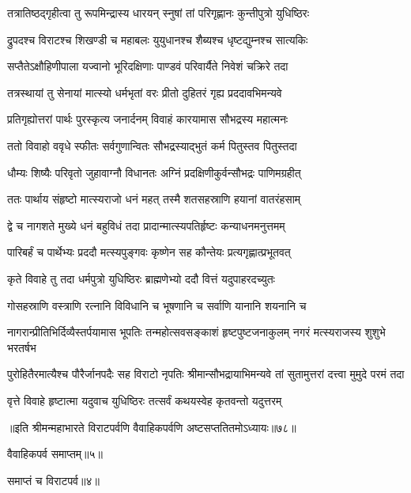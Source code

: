 \twolineshloka
{तत्रातिष्ठद्गृहीत्वा तु रूपमिन्द्रास्य धारयन्}
{स्नुषां तां परिगृह्णानः कुन्तीपुत्रो युधिष्ठिरः}


\twolineshloka
{द्रुपदश्च विराटश्च शिखण्डी च महाबलः}
{युयुधानश्च शैब्यश्च धृष्टद्युम्नश्च सात्यकिः}


\twolineshloka
{सप्तैतेऽक्षौहिणीपाला यज्वानो भूरिदक्षिणाः}
{पाण्डवं परिवार्यैते निवेशं चक्रिरे तदा}


\twolineshloka
{तत्रस्थायां तु सेनायां मात्स्यो धर्मभृतां वरः}
{प्रीतो दुहितरं गृह्य प्रददावभिमन्यवे}


\twolineshloka
{प्रतिगृह्योत्तरां पार्थः पुरस्कृत्य जनार्दनम्}
{विवाहं कारयामास सौभद्रस्य महात्मनः}


\twolineshloka
{ततो विवाहो ववृधे स्फीतः सर्वगुणान्वितः}
{सौभद्रस्याद्भुतं कर्म पितुस्तव पितुस्तदा}


\twolineshloka
{धौम्यः शिष्यैः परिवृतो जुहावाग्नौ विधानतः}
{अग्निं प्रदक्षिणीकुर्वन्सौभद्रः पाणिमग्रहीत्}


\twolineshloka
{ततः पार्थाय संहृष्टो मात्स्यराजो धनं महत्}
{तस्मै शतसहस्राणि हयानां वातरंहसाम्}


\twolineshloka
{द्वे च नागशते मुख्ये धनं बहुविधं तदा}
{प्रादान्मात्स्यपतिर्हृष्टः कन्याधनमनुत्तमम्}


\twolineshloka
{पारिबर्हं च पार्थेभ्यः प्रददौ मत्स्यपुङ्गवः}
{कृष्णेन सह कौन्तेयः प्रत्यगृह्णात्प्रभूतवत्}


\twolineshloka
{कृते विवाहे तु तदा धर्मपुत्रो युधिष्ठिरः}
{ब्राह्मणेभ्यो ददौ वित्तं यदुपाहरदच्युतः}


\twolineshloka
{गोसहस्राणि वस्त्राणि रत्नानि विविधानि च}
{भूषणानि च सर्वाणि यानानि शयनानि च}


\onelineshloka
{नागरान्प्रीतिभिर्दिव्यैस्तर्पयामास भूपतिः}
\twolineshloka
{तन्महोत्सवसङ्काशं हृष्टपुष्टजनाकुलम्}
{नगरं मत्स्यराजस्य शुशुभे भरतर्षभ}


\threelineshloka
{पुरोहितैरमात्यैश्च पौरैर्जानपदैः सह}
{विराटो नृपतिः श्रीमान्सौभद्रायाभिमन्यवे}
{तां सुतामुत्तरां दत्त्वा मुमुदे परमं तदा}




\twolineshloka
{वृत्ते विवाहे हृष्टात्मा यदुवाच युधिष्ठिरः}
{तत्सर्वं कथयस्वेह कृतवन्तो यदुत्तरम्}

॥इति श्रीमन्महाभारते विराटपर्वणि वैवाहिकपर्वणि अष्टसप्ततितमोऽध्यायः॥७८॥ 

वैवाहिकपर्व समाप्तम्॥५॥ 

समाप्तं च विराटपर्व॥४॥
